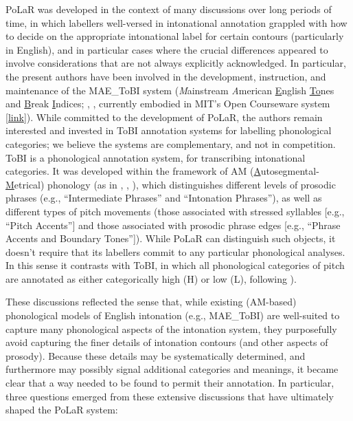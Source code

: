 \documentclass[11pt, twoside]{memoir}
\begin{document}
PoLaR was developed in the context of many discussions over long periods of time, in which labellers well-versed in intonational annotation grappled with how to decide on the appropriate intonational label for certain contours (particularly in English), and in particular cases where the crucial differences appeared to involve considerations that are not always explicitly acknowledged. 
{In particular, the present authors have been involved in the development, instruction, and maintenance of the MAE\_ToBI system (\textit{M}ainstream \textit{A}merican \uline{E}nglish \uline{To}nes and \uline{B}reak \uline{I}ndices; \citealt{beckmanhirschberg94}, \citealt{beckmanayers97}, \citealt{beckman-05} currently embodied in MIT’s Open Courseware system [\href{https://ocw.mit.edu/courses/electrical-engineering-and-computer-science/6-911-transcribing-prosodic-structure-of-spoken-utterances-with-tobi-january-iap-2006/}{link}]). While committed to the development of PoLaR, the authors remain interested and invested in ToBI annotation systems for labelling phonological categories; we believe the systems are complementary, and not in competition. ToBI is a phonological annotation system, for transcribing intonational categories. It was developed within the framework of AM (\uline{A}utosegmental-\uline{M}etrical) phonology (as in \citealt{pierrehumbert80}, \citealt{ladd08}, \citealt{arvanitifletcher20}), which distinguishes different levels of prosodic phrases (e.g., “Intermediate Phrases” and “Intonation Phrases”), as well as different types of pitch movements (those associated with stressed syllables [e.g., “Pitch Accents”] and those associated with prosodic phrase edges [e.g., “Phrase Accents and Boundary Tones”]). While PoLaR can distinguish such objects, it doesn’t require that its labellers commit to any particular phonological analyses. In this sense it contrasts with ToBI, in which all phonological categories of pitch are annotated as either categorically high (H) or low (L), following \citealt{pierrehumbert80}).}

These discussions reflected the sense that, while existing (AM-based) phonological models of English intonation (e.g., MAE\_ToBI) are well-suited to capture many phonological aspects of the intonation system, they purposefully avoid capturing the finer details of intonation contours (and other aspects of prosody).  Because these details may be systematically determined, and furthermore may possibly signal additional categories and meanings, it became clear that a way needed to be found to permit their annotation. In particular, three questions emerged from these extensive discussions that have ultimately shaped the PoLaR system:
\end{document}
